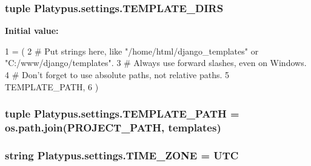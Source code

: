 \subsubsection[{T\+E\+M\+P\+L\+A\+T\+E\+\_\+\+D\+I\+R\+S}]{\setlength{\rightskip}{0pt plus 5cm}tuple Platypus.\+settings.\+T\+E\+M\+P\+L\+A\+T\+E\+\_\+\+D\+I\+R\+S}\label{namespace_platypus_1_1settings_ab156d619697e9ec9f9d435032956bc2c}
{\bfseries Initial value\+:}
\begin{DoxyCode}
1 = (
2     \textcolor{comment}{# Put strings here, like "/home/html/django\_templates" or "C:/www/django/templates".}
3     \textcolor{comment}{# Always use forward slashes, even on Windows.}
4     \textcolor{comment}{# Don't forget to use absolute paths, not relative paths.}
5     TEMPLATE\_PATH,
6 )
\end{DoxyCode}
\hypertarget{namespace_platypus_1_1settings_a93b2183481fb052a19a3aca12a9a6bea}{}
\subsubsection[{T\+E\+M\+P\+L\+A\+T\+E\+\_\+\+P\+A\+T\+H}]{\setlength{\rightskip}{0pt plus 5cm}tuple Platypus.\+settings.\+T\+E\+M\+P\+L\+A\+T\+E\+\_\+\+P\+A\+T\+H = os.\+path.\+join({\bf P\+R\+O\+J\+E\+C\+T\+\_\+\+P\+A\+T\+H}, \textquotesingle{}templates\textquotesingle{})}\label{namespace_platypus_1_1settings_a93b2183481fb052a19a3aca12a9a6bea}
\hypertarget{namespace_platypus_1_1settings_aca87dae3dacd633f793eac09d3e200fe}{}
\subsubsection[{T\+I\+M\+E\+\_\+\+Z\+O\+N\+E}]{\setlength{\rightskip}{0pt plus 5cm}string Platypus.\+settings.\+T\+I\+M\+E\+\_\+\+Z\+O\+N\+E = \textquotesingle{}U\+T\+C\textquotesingle{}}\label{namespace_platypus_1_1settings_aca87dae3dacd633f793eac09d3e200fe}
\hypertarget{namespace_platypus_1_1settings_a90000f621e26aafdbb06eaada0a13187}{}
